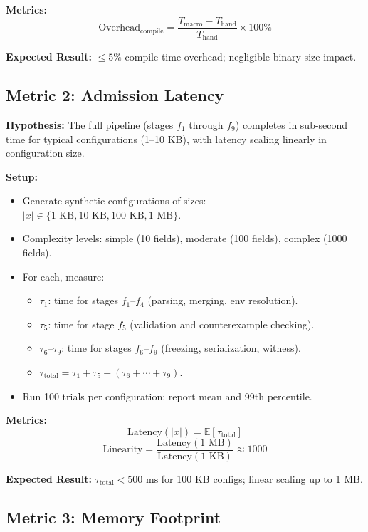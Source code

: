 \documentclass[12pt, letterpaper]{report}
\theoremstyle{plain}
\theoremstyle{definition}
\theoremstyle{remark}
\begin{document}
\textbf{Metrics:}
\[
  \mathrm{Overhead}_{\mathrm{compile}} = \frac{T_{\mathrm{macro}} - T_{\mathrm{hand}}}{T_{\mathrm{hand}}} \times 100\%
\]

\textbf{Expected Result:} $\leq 5\%$ compile-time overhead; negligible binary size impact.

\subsection{Metric 2: Admission Latency}

\textbf{Hypothesis:} The full pipeline (stages $f_1$ through $f_9$) completes
in sub-second time for typical configurations (1--10 KB), with latency
scaling linearly in configuration size.

\textbf{Setup:}
\begin{itemize}
  \item Generate synthetic configurations of sizes:
        $|x| \in \{1\text{ KB}, 10\text{ KB}, 100\text{ KB}, 1\text{ MB}\}$.
  \item Complexity levels: simple (10 fields), moderate (100 fields),
        complex (1000 fields).
  \item For each, measure:
    \begin{itemize}
      \item $\tau_1$: time for stages $f_1$--$f_4$ (parsing, merging, env resolution).
      \item $\tau_5$: time for stage $f_5$ (validation and counterexample checking).
      \item $\tau_6$--$\tau_9$: time for stages $f_6$--$f_9$ (freezing, serialization, witness).
      \item $\tau_{\mathrm{total}} = \tau_1 + \tau_5 + (\tau_6 + \cdots + \tau_9)$.
    \end{itemize}
  \item Run 100 trials per configuration; report mean and 99th percentile.
\end{itemize}

\textbf{Metrics:}
\[
  \mathrm{Latency}(|x|) = \mathbb{E}[\tau_{\mathrm{total}}]
\]
\[
  \mathrm{Linearity} = \frac{\mathrm{Latency}(1\text{ MB})}{\mathrm{Latency}(1\text{ KB})} \approx 1000
\]

\textbf{Expected Result:} $\tau_{\mathrm{total}} < 500\text{ ms}$ for 100 KB configs;
linear scaling up to 1 MB.

\subsection{Metric 3: Memory Footprint}
\end{document}

